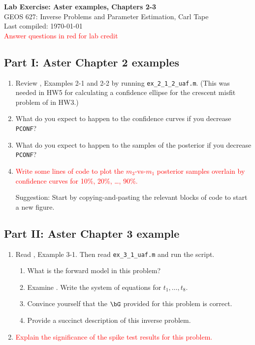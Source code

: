 \documentclass[11pt,titlepage,fleqn]{article}
\begin{document}

\begin{spacing}{1.2}
\centering
{\large \bf Lab Exercise: Aster examples, Chapters 2-3} \\
GEOS 627: Inverse Problems and Parameter Estimation, Carl Tape \\
Last compiled: \today \\
\textcolor{red}{Answer questions in red for lab credit}
\end{spacing}

\subsection*{Part I: Aster Chapter 2 examples}

\begin{enumerate}
\item Review \citet{AsterE2}, Examples 2-1 and 2-2 by running \verb+ex_2_1_2_uaf.m+.
(This was needed in HW5 for calculating a confidence ellipse for the crescent misfit problem of \citet{Tarantola2005} in HW3.)

\item What do you expect to happen to the confidence curves if you decrease \verb+PCONF+?

\item What do you expect to happen to the samples of the posterior if you decrease \verb+PCONF+?

\item \textcolor{red}{Write some lines of code to plot the $m_3$-vs-$m_1$ posterior samples overlain by confidence curves for 10\%, 20\%, \ldots, 90\%.}

Suggestion: Start by copying-and-pasting the relevant blocks of code to start a new figure.

\end{enumerate}


\subsection*{Part II: Aster Chapter 3 example}

\begin{enumerate}
\item Read \citet{AsterE2}, Example 3-1. Then read \verb+ex_3_1_uaf.m+ and run the script. 
%
\begin{enumerate}
\item What is the forward model in this problem?
\item Examine . Write the system of equations for $t_1, \ldots, t_8$.
\item Convince yourself that the $\bG$ provided for this problem is correct.
\item Provide a succinct description of this inverse problem.
\end{enumerate}

\item \textcolor{red}{Explain the significance of the spike test results for this problem.}

\end{enumerate}
\end{document}
